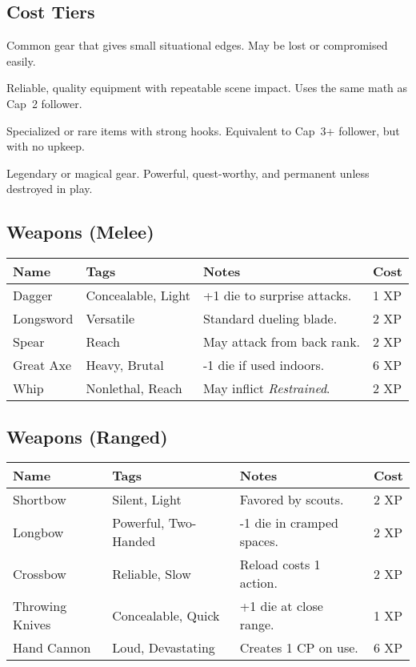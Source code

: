 \documentclass[12pt]{article}
\begin{document}
\subsection{Cost Tiers}
\begin{description}[leftmargin=2cm]
  \item[Basic (1 XP)] Common gear that gives small situational edges. May be lost or compromised easily.
  \item[Standard (2 XP)] Reliable, quality equipment with repeatable scene impact. Uses the same math as Cap~2 follower.
  \item[Superior (6 XP)] Specialized or rare items with strong hooks. Equivalent to Cap~3+ follower, but with no upkeep.
  \item[Artifact (12 XP or GM Award)] Legendary or magical gear. Powerful, quest-worthy, and permanent unless destroyed in play.
\end{description}

\subsection*{Weapons (Melee)}
\begin{tabular}{@{}llll@{}}
\toprule
\textbf{Name} & \textbf{Tags} & \textbf{Notes} & \textbf{Cost} \\
\midrule
Dagger & Concealable, Light & +1 die to surprise attacks. & 1 XP \\
Longsword & Versatile & Standard dueling blade. & 2 XP \\
Spear & Reach & May attack from back rank. & 2 XP \\
Great Axe & Heavy, Brutal & -1 die if used indoors. & 6 XP \\
Whip & Nonlethal, Reach & May inflict \emph{Restrained}. & 2 XP \\
\bottomrule
\end{tabular}

\subsection*{Weapons (Ranged)}
\begin{tabular}{@{}llll@{}}
\toprule
\textbf{Name} & \textbf{Tags} & \textbf{Notes} & \textbf{Cost} \\
\midrule
Shortbow & Silent, Light & Favored by scouts. & 2 XP \\
Longbow & Powerful, Two-Handed & -1 die in cramped spaces. & 2 XP \\
Crossbow & Reliable, Slow & Reload costs 1 action. & 2 XP \\
Throwing Knives & Concealable, Quick & +1 die at close range. & 1 XP \\
Hand Cannon & Loud, Devastating & Creates 1 CP on use. & 6 XP \\
\bottomrule
\end{tabular}
\end{document}
